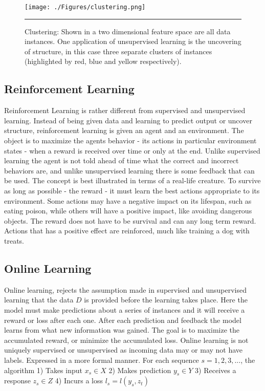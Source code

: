 \begin{figure}[htbp]
	\centering
		\texttt{[image: ./Figures/clustering.png]}
		\rule{35em}{0.5pt}
	\caption[Clustering]{Clustering: Shown in a two dimensional feature space are all data instances. One application of unsupervised learning is the uncovering of structure, in this case three separate clusters of instances (highlighted by red, blue and yellow respectively).}
	\label{fig:Clustering}
\end{figure}
	\subsection{Reinforcement Learning}

Reinforcement Learning is rather different from supervised and unsupervised learning.
Instead of being given data and learning to predict output or uncover structure, reinforcement learning is given an agent and an environment.
The object is to maximize the agents behavior - its actions in particular environment states - when a reward is received over time or only at the end.
Unlike supervised learning the agent is not told ahead of time what the correct and incorrect behaviors are, and unlike unsupervised learning there is some feedback that can be used.
The concept is best illustrated in terms of a real-life creature.
To survive as long as possible - the reward - it must learn the best actions appropriate to its environment.
Some actions may have a negative impact on its lifespan, such as eating poison, while others will have a positive impact, like avoiding dangerous objects.
The reward does not have to be survival and can any long term reward.
Actions that has a positive effect are reinforced, much like training a dog with treats.

	\subsection{Online Learning}
 
Online learning, rejects the assumption made in supervised and unsupervised learning that the data $D$ is provided before the learning takes place.
Here the model must make predictions about a series of instances and it will receive a reward or loss after each one\citep{sammut2011encyclopedia}.
After each prediction and feedback the model learns from what new information was gained.
The goal is to maximize the accumulated reward, or minimize the accumulated loss.
Online learning is not uniquely supervised or unsupervised as incoming data may or may not have labels.
Expressed in a more formal manner.
For each sequence $s = 1, 2, 3, ...$, the algorithm
1) Takes input $x_s \in X$
2) Makes prediction $y_s \in Y$
3) Receives a response $z_s \in Z$
4) Incurs a loss $l_s = l(y_s,z_t)$

